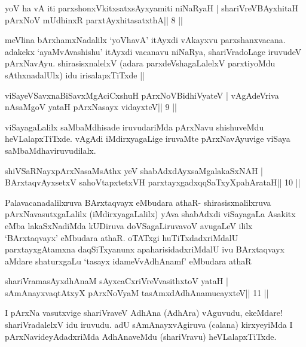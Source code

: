 \begin{shl}
yoV ha vA iti parxshonxVkitxsatxsAyxyamiti niNaRyaH |
shariVreV\s BAyxhitaH pArxNoV mUdhinxR parxtAyxhitasatxthA\hfill || 8 ||
\end{shl}

\begin{artha}
meVlina bArxhamxNadalilx `yoVhavA' itAyxdi vAkayxvu parxshanxvacana.
adakekx `ayaMvAvashishu' itAyxdi vacanavu niNaRya, shariVradoLage
iruvudeV pArxNavAyu. shirasisxnalelxV (adara parxdeVshagaLalelxV
parxtiyoMdu sAthxnadalUlx) idu irisalapxTiTxde ||
\end{artha}

\begin{shl}
viSayeVSavxnaBiSavxMgAciCxshuH  pArxNoV\s BidhiVyateV |
vAgAdeVriva nA\s\s saMgoV yataH pArxNasayx vidayxteV\hfill || 9 ||
\end{shl}

\begin{artha}
viSayagaLalilx saMbaMdhisade iruvudariMda pArxNavu shishuveMdu heVLalapxTiTxde. vAgAdi iMdirxyagaLige iruvaMte pArxNavAyuvige viSaya saMbaMdhaviruvudilalx.
\end{artha}

\begin{shl}
shiVSaRNayxpArxNasaMsAthx yeV shabAdxdAyxsaMgalakaSxNAH |
BArxtaqvAyxsetxV sahoVtapxtetxVH parxtayxgadxqqSaTxyXpahArataH\hfill || 10 ||
\end{shl}

\begin{artha}
Palavacanadalilxruva BArxtaqvayx eMbudara athaR- shirasisxnalilxruva
pArxNavasutxgaLalilx (iMdirxyagaLalilx) yAva shabAdxdi viSayagaLa
Asakitx eMba lakaSxNadiMda kUDiruva doVSagaLiruvavoV avugaLeV ililx
`BArxtaqvayx' eMbudara athaR. oTATxgi huTiTxdadxriMdalU
parxtayxgAtamxna daqSiTxyanunx apaharisidadxriMdalU ivu BArxtaqvayx
aMdare shaturxgaLu `tasayx idameVvA\s\s dhAnamf' eMbudara athaR
\end{artha}

\begin{shl}
shariVramasAyx\s\s dhAnaM sAyxcaCxriVreV\s vasithxtoV yataH |
sAmAnayxvaqtAtxyX pArxNoV\s yaM tasAmxdAdhAnamucayxteV\hfill || 11 ||
\end{shl}

\begin{artha}
I pArxNa vasutxvige shariVraveV AdhAna (AdhAra) vAguvudu, ekeMdare! shariVradalelxV idu iruvudu. adU sAmAnayxvAgiruva (calana) kirxyeyiMda I pArxNavideyAdadxriMda AdhAnaveMdu (shariVravu) heVLalapxTiTxde.
\end{artha}

